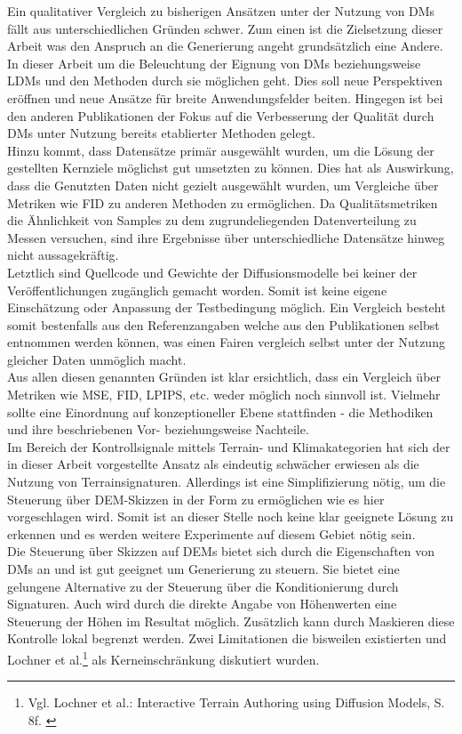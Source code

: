 Ein qualitativer Vergleich zu bisherigen Ansätzen unter der Nutzung von DMs fällt aus unterschiedlichen Gründen schwer. Zum einen ist die Zielsetzung dieser Arbeit was den Anspruch an die Generierung angeht grundsätzlich eine Andere. In dieser Arbeit um die Beleuchtung der Eignung von DMs beziehungsweise LDMs und den Methoden durch sie möglichen geht. Dies soll neue Perspektiven eröffnen und neue Ansätze für breite Anwendungsfelder beiten. Hingegen ist bei den anderen Publikationen der Fokus auf die Verbesserung der Qualität durch DMs unter Nutzung bereits etablierter Methoden gelegt. \\
Hinzu kommt, dass Datensätze primär ausgewählt wurden, um die Lösung der gestellten Kernziele möglichst gut umsetzten zu können. Dies hat als Auswirkung, dass die Genutzten Daten nicht gezielt ausgewählt wurden, um Vergleiche über Metriken wie FID zu anderen Methoden zu ermöglichen. Da Qualitätsmetriken die Ähnlichkeit von Samples zu dem zugrundeliegenden Datenverteilung zu Messen versuchen, sind ihre Ergebnisse über unterschiedliche Datensätze hinweg nicht aussagekräftig. \\ 
Letztlich sind Quellcode und Gewichte der Diffusionsmodelle bei keiner der Veröffentlichungen zugänglich gemacht worden. Somit ist keine eigene Einschätzung oder Anpassung der Testbedingung möglich. Ein Vergleich besteht somit bestenfalls aus den Referenzangaben welche aus den Publikationen selbst entnommen werden können, was einen Fairen vergleich selbst unter der Nutzung gleicher Daten unmöglich macht. \\
Aus allen diesen genannten Gründen ist klar ersichtlich, dass ein Vergleich über Metriken wie MSE, FID, LPIPS, etc. weder möglich noch sinnvoll ist. Vielmehr sollte eine Einordnung auf konzeptioneller Ebene stattfinden - die Methodiken und ihre beschriebenen Vor- beziehungsweise Nachteile. \\
Im Bereich der Kontrollsignale mittels Terrain- und Klimakategorien hat sich der in dieser Arbeit vorgestellte Ansatz als eindeutig schwächer erwiesen als die Nutzung von Terrainsignaturen. Allerdings ist eine Simplifizierung nötig, um die Steuerung über DEM-Skizzen in der Form zu ermöglichen wie es hier vorgeschlagen wird. Somit ist an dieser Stelle noch keine klar geeignete Lösung zu erkennen und es werden weitere Experimente auf diesem Gebiet nötig sein. \\
Die Steuerung über Skizzen auf DEMs bietet sich durch die Eigenschaften von DMs an und ist gut geeignet um Generierung zu steuern. Sie bietet eine gelungene Alternative zu der Steuerung über die Konditionierung durch Signaturen. Auch wird durch die direkte Angabe von Höhenwerten eine Steuerung der Höhen im Resultat möglich. Zusätzlich kann durch Maskieren diese Kontrolle lokal begrenzt werden. Zwei Limitationen die bisweilen existierten und Lochner et al.\footnote{
    Vgl. Lochner et al.: Interactive Terrain Authoring using Diffusion Models, S. 8f.
    \cite{lochner2023interactive}
} als Kerneinschränkung diskutiert wurden. \\
